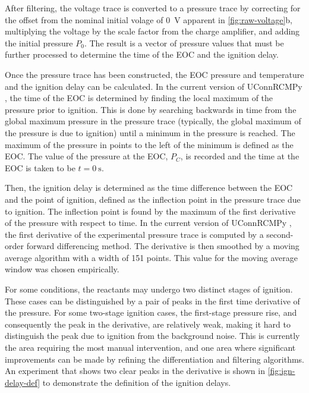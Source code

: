 \documentclass[12pt]{../ussci}
\begin{document}
After filtering, the voltage trace is converted to a pressure trace by
correcting for the offset from the nominal initial volage of \SI{0}{\V} apparent
in \mbox{\cref{fig:raw-voltage}b}, multiplying the voltage by the scale factor
from the charge amplifier, and adding the initial pressure \(P_0\). The result
is a vector of pressure values that must be further processed to determine the
time of the EOC and the ignition delay.

Once the pressure trace has been constructed, the EOC pressure and temperature
and the ignition delay can be calculated. In the current version of UConnRCMPy
\autocite{uconnrcmpy}, the time of the EOC is determined by finding the local
maximum of the pressure prior to ignition. This is done by searching backwards
in time from the global maximum pressure in the pressure trace (typically, the
global maximum of the pressure is due to ignition) until a minimum in the
pressure is reached. The maximum of the pressure in points to the left of the
minimum is defined as the EOC. The value of the pressure at the EOC, \(P_C\), is
recorded and the time at the EOC is taken to be \(t=\SI{0}{\s}\).

Then, the ignition delay is determined as the time difference between the EOC
and the point of ignition, defined as the inflection point in the pressure
trace due to ignition. The inflection point is found by the maximum
of the first derivative of the pressure with respect to time.
In the current version of UConnRCMPy \autocite{uconnrcmpy}, the first
derivative of the experimental pressure trace is computed by a
second-order forward differencing method. The derivative is then
smoothed by a moving average algorithm with a width of 151 points.
This value for the moving average window was chosen empirically.

For some conditions, the reactants may undergo two distinct stages of
ignition. These cases can be distinguished by a pair of peaks in the
first time derivative of the pressure. For some two-stage ignition
cases, the first-stage pressure rise, and consequently the peak in the
derivative, are relatively weak, making it hard to distinguish the peak
due to ignition from the background noise. This is currently the area
requiring the most manual intervention, and one area where significant
improvements can be made by refining the differentiation and
filtering algorithms. An experiment that shows two clear peaks
in the derivative is shown in \cref{fig:ign-delay-def} to
demonstrate the definition of the ignition delays.
\end{document}

